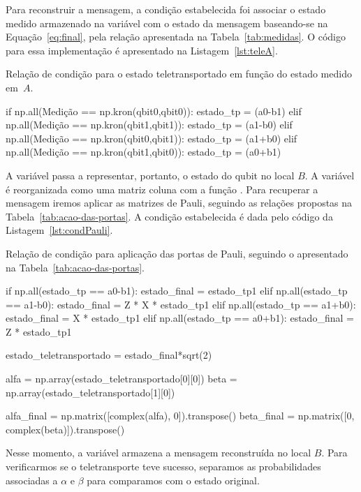 Para reconstruir a mensagem, a condição estabelecida foi associar o estado medido armazenado na variável  com o estado da mensagem baseando-se na Equação~\eqref{eq:final}, pela relação apresentada na Tabela~\ref{tab:medidas}. O código para essa implementação é apresentado na Listagem~\ref{lst:teleA}.

\begin{listing}[ht!]
  \caption{Relação de condição para o estado teletransportado em função do estado medido em~\(A\).}\label{lst:teleA}
  \begin{pycode}
  if np.all(Medição == np.kron(qbit0,qbit0)):
      estado_tp = (a0-b1)
  elif np.all(Medição == np.kron(qbit1,qbit1)):
      estado_tp = (a1-b0)
  elif np.all(Medição == np.kron(qbit0,qbit1)):
      estado_tp = (a1+b0)
  elif np.all(Medição == np.kron(qbit1,qbit0)):
      estado_tp = (a0+b1)
  \end{pycode}
\end{listing}

A variável  passa a representar, portanto, o estado do qubit no local \(B\). A variável é reorganizada como uma matriz coluna com a função . Para recuperar a mensagem iremos aplicar as matrizes de Pauli, seguindo as relações propostas na Tabela~\ref{tab:acao-das-portas}. A condição estabelecida é dada pelo código da Listagem~\ref{lst:condPauli}.

\begin{listing}[ht!]
  \caption{Relação de condição para aplicação das portas de Pauli, seguindo o apresentado na Tabela~\ref{tab:acao-das-portas}.}\label{lst:condPauli}
  \begin{pycode}
    if np.all(estado_tp == a0-b1):
        estado_final = estado_tp1
    elif np.all(estado_tp == a1-b0):
        estado_final = Z * X * estado_tp1
    elif np.all(estado_tp == a1+b0):
        estado_final = X * estado_tp1
    elif np.all(estado_tp == a0+b1):
        estado_final = Z * estado_tp1

    estado_teletransportado = estado_final*sqrt(2)

    alfa = np.array(estado_teletransportado[0][0])
    beta = np.array(estado_teletransportado[1][0])

    alfa_final = np.matrix([complex(alfa), 0]).transpose()
    beta_final = np.matrix([0, complex(beta)]).transpose()
  \end{pycode}
\end{listing}

Nesse momento, a variável  armazena a mensagem reconstruída no local \(B\). Para verificarmos se o teletransporte teve sucesso, separamos as probabilidades associadas a $\alpha$ e $\beta$ para comparamos com o estado original.

